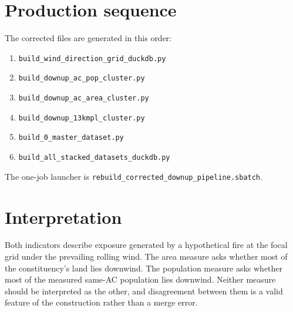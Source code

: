 \documentclass[10pt]{article}
\begin{document}
\section*{Production sequence}
The corrected files are generated in this order:
\begin{enumerate}
  \item \texttt{build\_wind\_direction\_grid\_duckdb.py}\par
  \item \texttt{build\_downup\_ac\_pop\_cluster.py}\par
  \item \texttt{build\_downup\_ac\_area\_cluster.py}\par
  \item \texttt{build\_downup\_13kmpl\_cluster.py}\par
  \item \texttt{build\_0\_master\_dataset.py}\par
  \item \texttt{build\_all\_stacked\_datasets\_duckdb.py}\par
\end{enumerate}
The one-job launcher is
\texttt{rebuild\_corrected\_downup\_pipeline.sbatch}.

\section*{Interpretation}
Both indicators describe exposure generated by a hypothetical fire at the
focal grid under the prevailing rolling wind. The area measure asks whether
most of the constituency's land lies downwind. The population measure asks
whether most of the measured same-AC population lies downwind. Neither measure
should be interpreted as the other, and disagreement between them is a valid
feature of the construction rather than a merge error.
\end{document}

